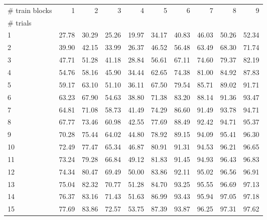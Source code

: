 \begin{tabularx}{\textwidth}{@{}Xrrrrrrrrr@{}}
\toprule
\# train blocks & 1 & 2 & 3 & 4 & 5 & 6 & 7 & 8 & 9 \\
\# trials &  &  &  &  &  &  &  &  &  \\
\midrule
1 & 27.78 & 30.29 & 25.26 & 19.97 & 34.17 & 40.83 & 46.03 & 50.26 & 52.34 \\
2 & 39.90 & 42.15 & 33.99 & 26.37 & 46.52 & 56.48 & 63.49 & 68.30 & 71.74 \\
3 & 47.71 & 51.28 & 41.18 & 28.84 & 56.61 & 67.11 & 74.60 & 79.37 & 82.19 \\
4 & 54.76 & 58.16 & 45.90 & 34.44 & 62.65 & 74.38 & 81.00 & 84.92 & 87.83 \\
5 & 59.17 & 63.10 & 51.10 & 36.11 & 67.50 & 79.54 & 85.71 & 89.02 & 91.71 \\
6 & 63.23 & 67.90 & 54.63 & 38.80 & 71.38 & 83.20 & 88.14 & 91.36 & 93.47 \\
7 & 64.81 & 71.08 & 58.73 & 41.49 & 74.29 & 86.60 & 91.49 & 93.78 & 94.71 \\
8 & 67.77 & 73.46 & 60.98 & 42.55 & 77.69 & 88.49 & 92.42 & 94.71 & 95.37 \\
9 & 70.28 & 75.44 & 64.02 & 44.80 & 78.92 & 89.15 & 94.09 & 95.41 & 96.30 \\
10 & 72.49 & 77.47 & 65.34 & 46.87 & 80.91 & 91.31 & 94.53 & 96.21 & 96.65 \\
11 & 73.24 & 79.28 & 66.84 & 49.12 & 81.83 & 91.45 & 94.93 & 96.43 & 96.83 \\
12 & 74.34 & 80.47 & 69.49 & 50.00 & 83.86 & 92.11 & 95.02 & 96.56 & 96.91 \\
13 & 75.04 & 82.32 & 70.77 & 51.28 & 84.70 & 93.25 & 95.55 & 96.69 & 97.13 \\
14 & 76.37 & 83.16 & 71.43 & 51.63 & 86.99 & 93.43 & 95.94 & 97.05 & 97.18 \\
15 & 77.69 & 83.86 & 72.57 & 53.75 & 87.39 & 93.87 & 96.25 & 97.31 & 97.62 \\
\bottomrule
\end{tabularx}

